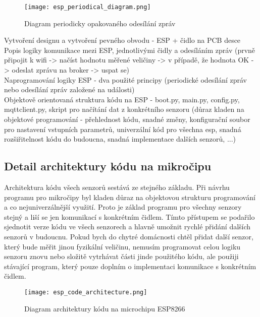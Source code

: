 \begin{figure}[H]
  \centering
  \texttt{[image: esp\_periodical\_diagram.png]}
  \caption{Diagram periodicky opakovaného odesílání zpráv}
  \label{fig:hardware_components:LABEL}
\end{figure}


Vytvoření designu a vytvoření pevného obvodu - ESP + čidlo na PCB desce \\
Popis logiky komunikace mezi ESP, jednotlivými čidly a odesíláním zpráv (prvně připojit k wifi -> načíst hodnotu měřené veličiny -> v případě, že hodnota OK -> odeslat zprávu na broker -> uspat se) \\
Naprogramování logiky ESP - dva použité principy (periodické odesílání zpráv nebo odesílání zpráv založené na události) \\
Objektově orientovaná struktura kódu na ESP - boot.py, main.py, config.py, mqttclient.py, skript pro načítání dat z konkrétního senzoru (důraz kladen na objektové programování - přehlednost kódu, snadné změny, konfigurační soubor pro nastavení vstupních parametrů, univerzální kód pro všechna esp, snadná rozšiřitelnost kódu do budoucna, snadná implementace dalších senzorů, ...) \\



 \subsection*{Detail architektury kódu na mikročipu}
Architektura kódu všech senzorů sestává ze stejného základu. Při návrhu programu pro mikročipy byl kladen důraz na objektovou strukturu programování a co nejuniverzálnější využití. Proto je základ programu pro všechny senzory stejný a liší se jen komunikací s konkrétním čidlem. Tímto přístupem se podařilo sjednotit verze kódu ve všech senzorech a hlavně umožnit rychlé přidání dalších senzorů v budoucnu. Pokud bych do chytré domácnosti chtěl přidat další senzor, který bude měřit jinou fyzikální veličinu, nemusím programovat celou logiku senzoru znovu nebo složitě vytrhávat části jinde použitého kódu, ale použiji stávající program, který pouze doplním o implementaci komunikace s konkrétním čidlem. 

\begin{figure}[H]
  \centering
  \texttt{[image: esp\_code\_architecture.png]}
  \caption{Diagram architektury kódu na microchipu ESP8266}
  \label{fig:hardware_components:LABEL}
\end{figure}

